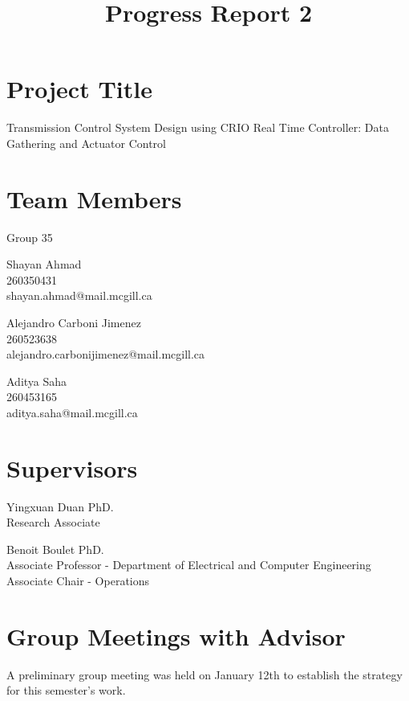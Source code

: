 \documentclass[12pt]{article}
\begin{document}
\title{Progress Report 2}
\date{}
\maketitle
\section*{Project Title} 
Transmission Control System Design using CRIO Real Time Controller:
Data Gathering and Actuator Control
\section*{Team Members}
Group 35 \newline

\hangindent=17.62482pt
Shayan Ahmad \\
260350431 \\
shayan.ahmad@mail.mcgill.ca \newline

\hangindent=17.62482pt
Alejandro Carboni Jimenez \\
260523638 \\
alejandro.carbonijimenez@mail.mcgill.ca \newline

\hangindent=17.62482pt
Aditya Saha \\
260453165 \\
aditya.saha@mail.mcgill.ca

\section*{Supervisors}
\hangindent=17.62482pt
Yingxuan Duan PhD.\\ 
Research Associate\newline 

\hangindent=17.62482pt
Benoit Boulet PhD.\\
Associate Professor - Department of Electrical and Computer Engineering\\
Associate Chair - Operations

\newpage
\section*{Group Meetings with Advisor}
A preliminary group meeting was held on January 12th to establish the
strategy for this semester's work. \newline
\end{document}
